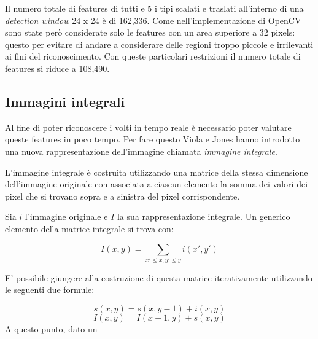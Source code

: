 Il numero totale di features di tutti e 5 i tipi scalati e traslati all'interno di una \emph{detection window} 24 x 24 è di 162,336. Come nell'implementazione di OpenCV sono state però considerate solo le features con un area superiore a 32 pixels: questo per evitare di andare a considerare delle regioni troppo piccole e irrilevanti ai fini del riconoscimento. Con queste particolari restrizioni il numero totale di features si riduce a 108,490. 

\subsection{Immagini integrali}

Al fine di poter riconoscere i volti in tempo reale è necessario poter valutare queste features in poco tempo. Per fare questo Viola e Jones hanno introdotto una nuova rappresentazione dell'immagine chiamata \emph{immagine integrale}.

L'immagine integrale è costruita utilizzando una matrice della stessa dimensione dell'immagine originale con associata a ciascun elemento la somma dei valori dei pixel che si trovano sopra e a sinistra del pixel corrispondente.

Sia $i$ l'immagine originale e $I$ la sua rappresentazione integrale. Un generico elemento della matrice integrale si trova con:

$$
I(x, y) = \sum_{x' \leq x, y' \leq y} i(x', y')
$$

E' possibile giungere alla costruzione di questa matrice iterativamente utilizzando le seguenti due formule:

$$
s(x, y) = s(x, y − 1) + i(x, y)
$$
$$
I(x,y) = I(x −1,y) + s(x,y)
$$
A questo punto, dato un 


